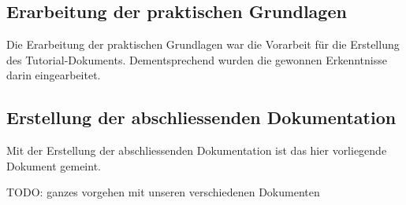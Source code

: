 \subsection{Erarbeitung der praktischen Grundlagen}
\label{subsec:praktische_grundlagen}

Die Erarbeitung der praktischen Grundlagen war die Vorarbeit für die Erstellung des Tutorial-Dokuments. Dementsprechend wurden die gewonnen Erkenntnisse darin eingearbeitet.

\subsection{Erstellung der abschliessenden Dokumentation}
\label{subsec:abschliessende_dokumentation}
Mit der Erstellung der abschliessenden Dokumentation ist das hier vorliegende Dokument gemeint.

TODO: ganzes vorgehen mit unseren verschiedenen Dokumenten  
